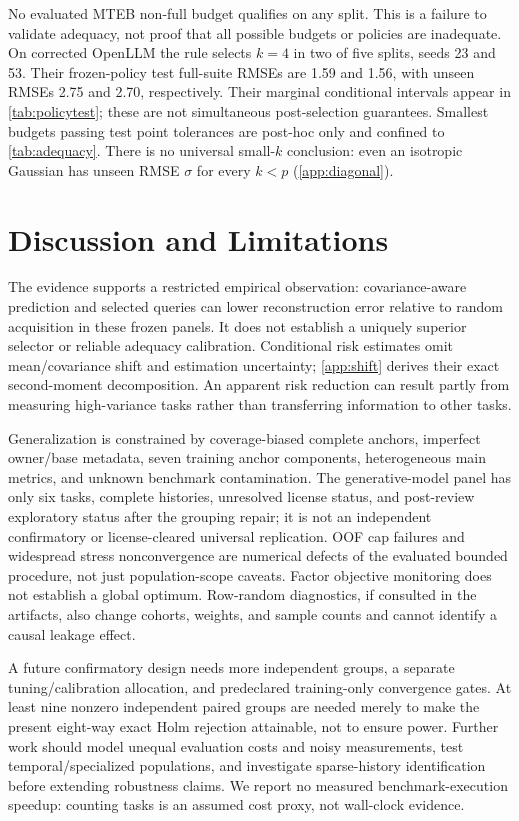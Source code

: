 \documentclass{article}
\begin{document}
No evaluated MTEB non-full budget qualifies on any split. This is a failure to validate adequacy, not proof that all possible budgets or policies are inadequate. On corrected OpenLLM the rule selects $k=4$ in two of five splits, seeds 23 and 53. Their frozen-policy test full-suite RMSEs are 1.59 and 1.56, with unseen RMSEs 2.75 and 2.70, respectively. Their marginal conditional intervals appear in \cref{tab:policytest}; these are not simultaneous post-selection guarantees. Smallest budgets passing test point tolerances are post-hoc only and confined to \cref{tab:adequacy}. There is no universal small-$k$ conclusion: even an isotropic Gaussian has unseen RMSE $\sigma$ for every $k<p$ (\cref{app:diagonal}).

\section{Discussion and Limitations}
\label{sec:discussion}
The evidence supports a restricted empirical observation: covariance-aware prediction and selected queries can lower reconstruction error relative to random acquisition in these frozen panels. It does not establish a uniquely superior selector or reliable adequacy calibration. Conditional risk estimates omit mean/covariance shift and estimation uncertainty; \cref{app:shift} derives their exact second-moment decomposition. An apparent risk reduction can result partly from measuring high-variance tasks rather than transferring information to other tasks.

Generalization is constrained by coverage-biased complete anchors, imperfect owner/base metadata, seven training anchor components, heterogeneous main metrics, and unknown benchmark contamination. The generative-model panel has only six tasks, complete histories, unresolved license status, and post-review exploratory status after the grouping repair; it is not an independent confirmatory or license-cleared universal replication. OOF cap failures and widespread stress nonconvergence are numerical defects of the evaluated bounded procedure, not just population-scope caveats. Factor objective monitoring does not establish a global optimum. Row-random diagnostics, if consulted in the artifacts, also change cohorts, weights, and sample counts and cannot identify a causal leakage effect.

A future confirmatory design needs more independent groups, a separate tuning/calibration allocation, and predeclared training-only convergence gates. At least nine nonzero independent paired groups are needed merely to make the present eight-way exact Holm rejection attainable, not to ensure power. Further work should model unequal evaluation costs and noisy measurements, test temporal/specialized populations, and investigate sparse-history identification before extending robustness claims. We report no measured benchmark-execution speedup: counting tasks is an assumed cost proxy, not wall-clock evidence.
\end{document}
